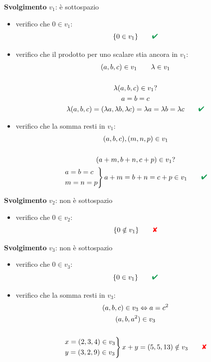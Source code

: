 \documentclass[italian]{article}
\newcommand{\crossmark}{\textcolor{red}{\text{$\qquad$\ding{56}}}}
\renewcommand{\checkmark}{\textcolor{ForestGreen}{\text{$\qquad$\ding{52}}}}
\begin{document}
\noindent\textbf{Svolgimento} $v_1$: è sottospazio
\begin{itemize}
	\item verifico che $0 \in v_1$:
	\[
		\{ 0 \in v_1 \} \checkmark
	\]
	\item verifico che il prodotto per uno scalare stia ancora in $v_1$:
	\begin{gather*}
		(a,b,c) \in v_1 \qquad \lambda \in v_1\\\\
		\lambda(a,b,c) \in v_1 ?\\
		a=b=c \\
		\lambda(a,b,c) = (\lambda a , \lambda b , \lambda c) = \lambda a = \lambda b = \lambda c \checkmark
	\end{gather*}
	\item verifico che la somma resti in $v_1$:
	\begin{gather*}
		(a,b,c),(m,n,p) \in v_1\\\\
		(a+m,b+n,c+p) \in v_1 ?\\
		\begin{rcases*}
			a = b = c \\
			m = n = p
		\end{rcases*}
		a + m = b + n = c + p \in v_1 \checkmark  
	\end{gather*}
\end{itemize}

\noindent\textbf{Svolgimento} $v_2$: non è sottospazio
\begin{itemize}
	\item verifico che $0 \in v_2$:
	\[
		\{ 0 \notin v_1 \} \crossmark
	\]
\end{itemize}

\noindent\textbf{Svolgimento} $v_3$: non è sottospazio
\begin{itemize}
	\item verifico che $0 \in v_3$:
	\[
		\{ 0 \in v_1 \} \checkmark
	\]
	\item verifico che la somma resti in $v_3$:
	\begin{gather*}
	(a,b,c) \in v_3 \Leftrightarrow a=c^2\\
	(a,b,a^2) \in v_3\\\\
	\begin{rcases*}
		x=(2,3,4) \in v_3 \\
		y = (3,2,9) \in v_3
	\end{rcases*}
	x+y=(5,5,13) \notin v_3 \crossmark
	\end{gather*}
\end{itemize}
\end{document}
